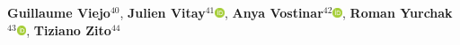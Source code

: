 \textbf{Guillaume Viejo}$^{40}$,
\textbf{Julien Vitay}$^{41}$\href{http://orcid.org/0000-0001-5229-2349}{\includegraphics[width=8pt]{orcid}},
\textbf{Anya Vostinar}$^{42}$\href{http://orcid.org/0000-0001-7216-5283}{\includegraphics[width=8pt]{orcid}},
\textbf{Roman Yurchak}$^{43}$\href{http://orcid.org/0000-0002-2565-4444}{\includegraphics[width=8pt]{orcid}},
\textbf{Tiziano Zito}$^{44}$\\
